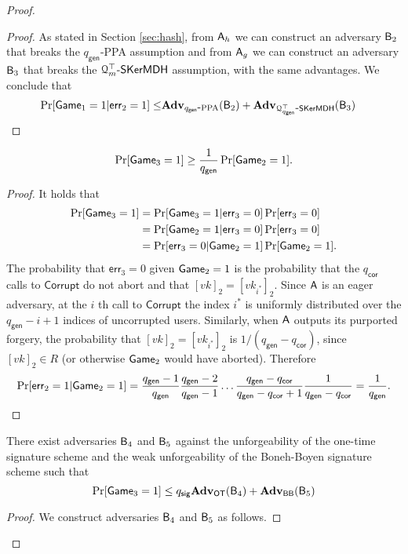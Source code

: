 \begin{proof}
\begin{proof}
As stated in Section \ref{sec:hash}, from $\mathsf{A}_h$ we can construct an adversary $\mathsf{B}_2$ that breaks the $q_\mathsf{gen}$-PPA assumption and from $\mathsf{A}_g$ we can construct an adversary $\mathsf{B}_3$ that breaks the $\mathcal{Q}^\top_m\mbox{-}\mathsf{SKerMDH}$ assumption, with the same advantages. We conclude that 
\begin{align*}
\Pr[\mathsf{Game}_1=1|\mathsf{err}_2=1] \leq & \mathbf{Adv}_{{q_\mathsf{gen}}\mbox{-}\mathrm{PPA}}(\mathsf{B}_2)+\mathbf{Adv}_{\mathcal{Q}^\top_{q_\mathsf{gen}}\mbox{-}\mathsf{SKerMDH}}(\mathsf{B}_3)
\end{align*}
\end{proof}

\begin{lemma}
$$
\Pr[\mathsf{Game}_3=1]\geq \frac{1}{{q_\mathsf{gen}}}\Pr[\mathsf{Game}_2=1].
$$
\end{lemma}
\begin{proof}
It holds that
\begin{align*}
\Pr[\mathsf{Game}_3=1] &= \Pr[\mathsf{Game}_3=1|\mathsf{err}_3=0]\Pr[\mathsf{err}_3=0]\\
&=\Pr[\mathsf{Game}_2=1|\mathsf{err}_3=0]\Pr[\mathsf{err}_3=0]\\
&=\Pr[\mathsf{err}_3=0|\mathsf{Game}_2=1]\Pr[\mathsf{Game}_2=1].
\end{align*}
The probability that $\mathsf{err}_3=0$ given $\mathsf{Game}_2=1$ is the probability that the ${q_\mathsf{cor}}$ calls to $\mathsf{Corrupt}$ do not abort and that $[vk]_2=[vk_{i^*}]_2$. Since $\mathsf{A}$ is an eager adversary, at the $i$ th call to $\mathsf{Corrupt}$ the index $i^*$ is uniformly distributed over the ${q_\mathsf{gen}}-i+1$ indices of uncorrupted users. Similarly, when $\mathsf{A}$ outputs its purported forgery, the probability that $[vk]_2=[vk_{i^*}]_2$ is $1/({q_\mathsf{gen}}-{q_\mathsf{cor}})$, since $[vk]_2\in R$ (or otherwise $\mathsf{Game}_2$ would have aborted). Therefore
$$
\Pr[\mathsf{err}_2=1|\mathsf{Game}_2=1]=\frac{{q_\mathsf{gen}}-1}{{q_\mathsf{gen}}}\frac{{q_\mathsf{gen}}-2}{{q_\mathsf{gen}}-1}\ldots\frac{{q_\mathsf{gen}}-{q_\mathsf{cor}}}{{q_\mathsf{gen}}-{q_\mathsf{cor}}+1}\frac{1}{{q_\mathsf{gen}}-{q_\mathsf{cor}}}=\frac{1}{{q_\mathsf{gen}}}.
$$ 
\end{proof}

\begin{lemma}  There exist adversaries $\mathsf{B}_4$ and $\mathsf{B}_5$ against the unforgeability of the one-time signature scheme and the weak unforgeability of the Boneh-Boyen signature scheme such that
$$
\Pr[\mathsf{Game}_3=1]\leq q_\mathsf{sig}\mathbf{Adv}_{\mathsf{OT}}(\mathsf{B}_4)+\mathbf{Adv}_{\mathsf{BB}}(\mathsf{B}_5)
$$
\end{lemma}
\begin{proof}
We construct adversaries $\mathsf{B}_4$ and $\mathsf{B}_5$ as follows.


\end{proof}
\end{proof}
